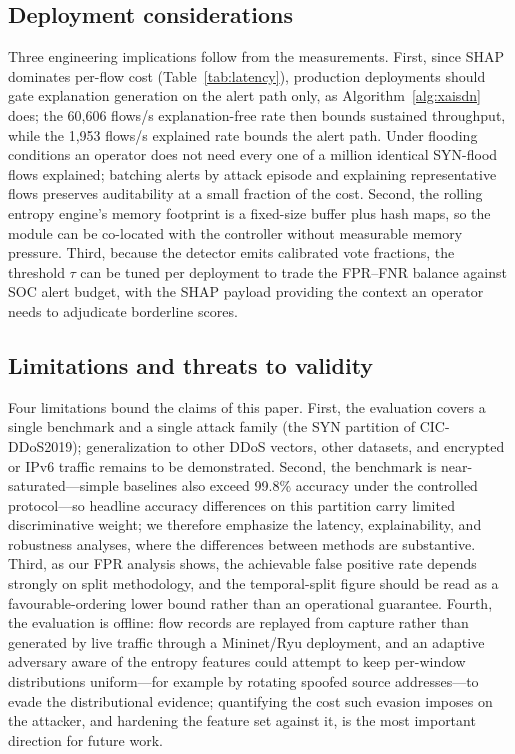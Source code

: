 ﻿\documentclass[review,12pt]{elsarticle}
\begin{document}
\subsection{Deployment considerations}
Three engineering implications follow from the measurements. First, since SHAP dominates per-flow cost (Table~\ref{tab:latency}), production deployments should gate explanation generation on the alert path only, as Algorithm~\ref{alg:xaisdn} does; the 60,606 flows/s explanation-free rate then bounds sustained throughput, while the 1,953 flows/s explained rate bounds the alert path. Under flooding conditions an operator does not need every one of a million identical SYN-flood flows explained; batching alerts by attack episode and explaining representative flows preserves auditability at a small fraction of the cost. Second, the rolling entropy engine's memory footprint is a fixed-size buffer plus hash maps, so the module can be co-located with the controller without measurable memory pressure. Third, because the detector emits calibrated vote fractions, the threshold $\tau$ can be tuned per deployment to trade the FPR--FNR balance against SOC alert budget, with the SHAP payload providing the context an operator needs to adjudicate borderline scores.

\subsection{Limitations and threats to validity}
Four limitations bound the claims of this paper. First, the evaluation covers a single benchmark and a single attack family (the SYN partition of CIC-DDoS2019); generalization to other DDoS vectors, other datasets, and encrypted or IPv6 traffic remains to be demonstrated. Second, the benchmark is near-saturated---simple baselines also exceed 99.8\% accuracy under the controlled protocol---so headline accuracy differences on this partition carry limited discriminative weight; we therefore emphasize the latency, explainability, and robustness analyses, where the differences between methods are substantive. Third, as our FPR analysis shows, the achievable false positive rate depends strongly on split methodology, and the temporal-split figure should be read as a favourable-ordering lower bound rather than an operational guarantee. Fourth, the evaluation is offline: flow records are replayed from capture rather than generated by live traffic through a Mininet/Ryu deployment, and an adaptive adversary aware of the entropy features could attempt to keep per-window distributions uniform---for example by rotating spoofed source addresses---to evade the distributional evidence; quantifying the cost such evasion imposes on the attacker, and hardening the feature set against it, is the most important direction for future work.
\end{document}
